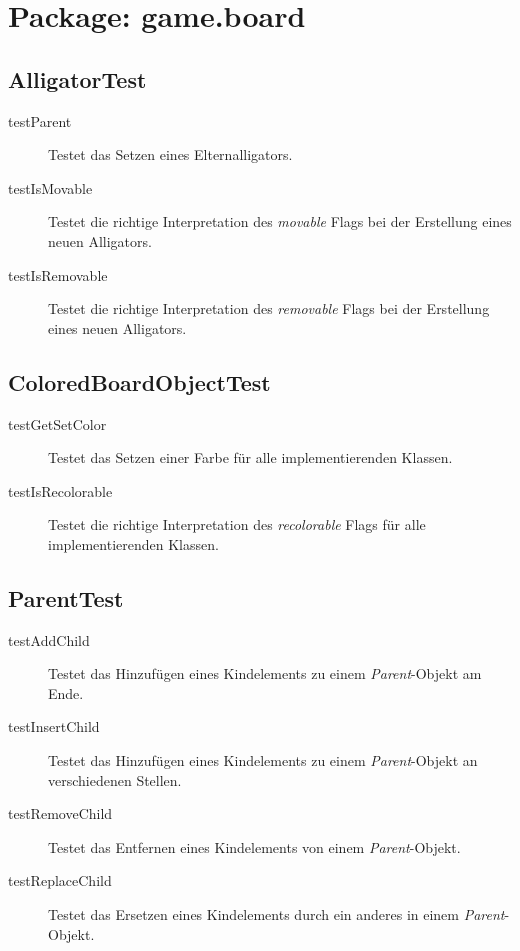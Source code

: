 \section{Package: game.board}

\subsection{AlligatorTest}
\begin{description}
\item[testParent]
Testet das Setzen eines Elternalligators.

\item[testIsMovable]
Testet die richtige Interpretation des \emph{movable} Flags bei der Erstellung eines neuen Alligators.

\item[testIsRemovable]
Testet die richtige Interpretation des \emph{removable} Flags bei der Erstellung eines neuen Alligators.

\end{description}

\subsection{ColoredBoardObjectTest}
\begin{description}
\item[testGetSetColor]
Testet das Setzen einer Farbe für alle implementierenden Klassen.

\item[testIsRecolorable]
Testet die richtige Interpretation des \emph{recolorable} Flags für alle implementierenden Klassen.

\end{description}

\subsection{ParentTest}
\begin{description}
\item[testAddChild]
Testet das Hinzufügen eines Kindelements zu einem \emph{Parent}-Objekt am Ende.

\item[testInsertChild]
Testet das Hinzufügen eines Kindelements zu einem \emph{Parent}-Objekt an verschiedenen Stellen.

\item[testRemoveChild]
Testet das Entfernen eines Kindelements von einem \emph{Parent}-Objekt.

\item[testReplaceChild]
Testet das Ersetzen eines Kindelements durch ein anderes in einem \emph{Parent}-Objekt.

\end{description}
